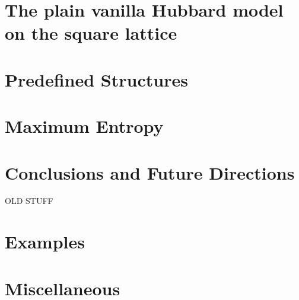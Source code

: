 \documentclass[10pt,Arial]{scrartcl}
\begin{document}
\section{The plain vanilla Hubbard model on the square lattice} \label{sec:hubbard}

\section{Predefined Structures}\label{sec:predefined}


\section{Maximum Entropy}\label{sec:maxent}


\section{Conclusions and Future Directions}\label{sec:con}

{\color{red} OLD STUFF} 
\section{Examples}\label{sec:ex}

\section{Miscellaneous}\label{sec:misc}







 

\printindex
{}

\end{document}
